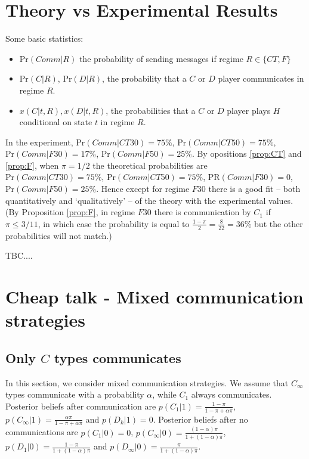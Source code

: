 \documentclass[12pt]{article}
\theoremstyle{definition}
\theoremstyle{remark}
\begin{document}
\section{Theory vs Experimental Results}
Some basic statistics:
\begin{itemize}
	\item $\text{Pr}(Comm|R)$ the probability of sending messages if regime $R\in\{CT,F\}$
	\item $\text{Pr}(C|R)$, $\text{Pr}(D|R)$, the probability that a $C$ or $D$ player communicates in regime $R$.
	\item $x(C|t,R), x(D|t,R)$, the probabilities that a $C$ or $D$ player plays $H$ conditional on state $t$ in regime $R$.
\end{itemize}
In the experiment, $\text{Pr}(Comm|CT30)=75\%$, $\text{Pr}(Comm|CT50)=75\%$, $\text{Pr}(Comm|F30)=17\%$, $\text{Pr}(Comm|F50)=25\%$. By opositions \ref{prop:CT} and \ref{prop:F}, when $\pi=1/2$ the theoretical probabilities are $\text{Pr}(Comm|CT30)=75\%$, $\text{Pr}(Comm|CT50)=75\%$, $\text{PR}(Comm|F30)=0$, $\text{Pr}(Comm|F50)=25\%$. Hence except for regime $F30$ there is a good fit -- both quantitatively and `qualitatively' -- of the theory with the experimental values. (By Proposition \ref{prop:F}, in regime $F30$ there is communication by $C_1$ if $\pi\leq 3/11$, in which case the probability is equal to $\frac{1-\pi}{2}=\frac{8}{22}=36\%$ but the other probabilities will not match.)

TBC....


\section{Cheap talk - Mixed communication strategies}

\subsection{Only $C$ types communicates}

In this section, we consider mixed communication strategies. We assume that $C_\infty$ types communicate with a probability $\alpha$, while $C_1$ always communicates. Posterior beliefs after communication are $p(C_1|1) = \frac{1-\pi}{1-\pi + \alpha \pi}$, $p(C_\infty|1) = \frac{\alpha \pi}{1-\pi + \alpha \pi}$ and $p(D_k|1) = 0$. Posterior beliefs after no communications are $p(C_1|0) = 0$, $p(C_\infty|0) = \frac{(1-\alpha) \pi}{1+(1-\alpha)\pi}$, $p(D_1|0) = \frac{1-\pi}{1+(1-\alpha)\pi}$ and $p(D_\infty|0) = \frac{\pi}{1+(1-\alpha)\pi}$.
\end{document}
